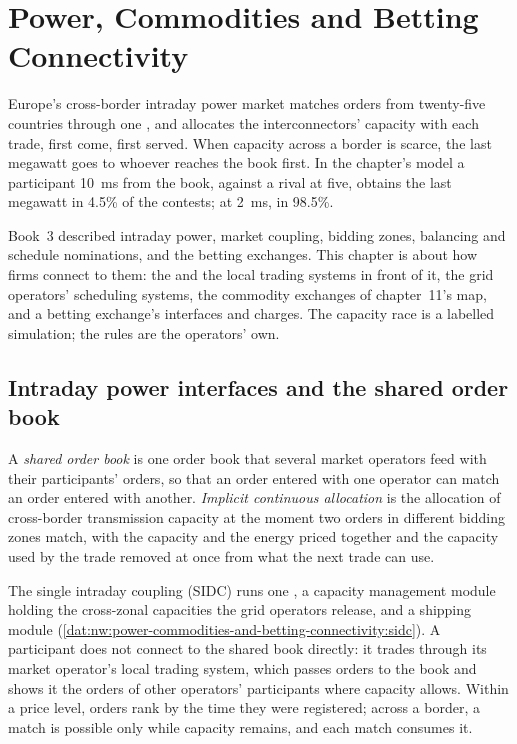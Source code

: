 \chapter{Power, Commodities and Betting Connectivity}\label{ch:nw:power-commodities-and-betting-connectivity}

Europe's cross-border intraday power market matches orders from twenty-five countries through one , and
allocates the interconnectors' capacity with each trade, first come, first served. When capacity across a border is scarce,
the last megawatt goes to whoever reaches the book first. In the chapter's model a participant \qty{10}{\milli\second} from
the book, against a rival at five, obtains the last megawatt in 4.5\% of the contests; at \qty{2}{\milli\second}, in 98.5\%.

Book~3 described intraday power, market coupling, bidding zones, balancing and schedule nominations, and the betting exchanges.
This chapter is about how firms connect to them: the  and the local trading systems in front of it, the
grid operators' scheduling systems, the commodity exchanges of chapter~11's map, and a betting exchange's interfaces and
charges. The capacity race is a labelled simulation; the rules are the operators' own.

\section{Intraday power interfaces and the shared order book}

\begin{definition}\label{def:nw:power-commodities-and-betting-connectivity:sob}
A \emph{shared order book} is one order book that several market operators feed with their
participants' orders, so that an order entered with one operator can match an order entered with another.
\emph{Implicit continuous allocation} is the allocation of cross-border transmission
capacity at the moment two orders in different bidding zones match, with the capacity and the energy priced together and the
capacity used by the trade removed at once from what the next trade can use.
\end{definition}

The single intraday coupling (SIDC) runs one , a
capacity management module holding the cross-zonal capacities the grid operators release, and a shipping module
(\cref{dat:nw:power-commodities-and-betting-connectivity:sidc}). A participant does not connect to the shared book directly: it
trades through its market operator's local trading system, which passes orders to the book and shows it the orders of other
operators' participants where capacity allows. Within a price level, orders rank by the time they were registered; across a
border, a match is possible only while capacity remains, and each match consumes it.

